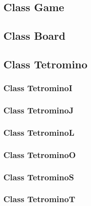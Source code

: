 \documentclass[a4paper]{article}
\begin{document}
\subsection{Class Game}



\subsection{Class Board}

%

\subsection{Class Tetromino}



\subsubsection{Class TetrominoI}



\subsubsection{Class TetrominoJ}



\subsubsection{Class TetrominoL}



\subsubsection{Class TetrominoO}



\subsubsection{Class TetrominoS}



\subsubsection{Class TetrominoT}
\end{document}
